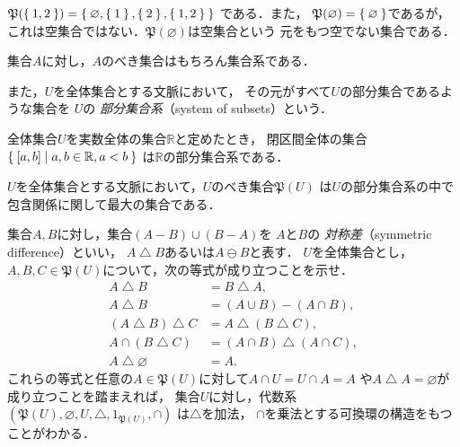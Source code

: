     \begin{ex} \label{ex:powerset}
      $\mathfrak{P}(\Set{1,  2} ) = 
      \Set{ \varnothing ,  \Set{1} ,  \Set{2} ,  \Set{1,  2}}$
      である．また，
      $\mathfrak{P}( \varnothing) = \Set{ \varnothing}$であるが，
      これは空集合ではない．$\mathfrak{P}( \varnothing)$は空集合という
      元をもつ空でない集合である．
    \end{ex}
    
    
    集合$A$に対し，$A$のべき集合はもちろん集合系である．

    また，$U$を全体集合とする文脈において，
    その元がすべて$U$の部分集合であるような集合を
    $U$の
    \emph{部分集合系}（system of subsets）という．

    \begin{ex} \label{ex:systemR}
      全体集合$U$を実数全体の集合$\mathbb{R}$と定めたとき，
      閉区間全体の集合$\Set{ [a,b] \mid a,b \in \mathbb{R} , a<b}$
      は$\mathbb{R}$の部分集合系である．
    \end{ex}

    $U$を全体集合とする文脈において，$U$のべき集合$\mathfrak{P}(U)$
    は$U$の部分集合系の中で包含関係に関して最大の集合である．

 
    \begin{que} \label{que:taisyousa}
      集合$A,  B$に対し，集合$(A-B) \cup (B - A) $を
      $A$と$B$の
      \emph{対称差}（symmetric difference）といい，
      $A \bigtriangleup B$あるいは$A \ominus B$と表す．
      $U$を全体集合とし，
      $A,  B,  C \in \mathfrak{P}(U)$について，次の等式が成り立つことを示せ．
      \begin{align}
        A \bigtriangleup B & = B \bigtriangleup A ,
        \label{eq:symdiftaisyou} \\
        A \bigtriangleup B & = (A \cup B) - (A \cap B),
        \label{eq:symdifcupcap} \\
        (A \bigtriangleup B) \bigtriangleup C & = A \bigtriangleup (B \bigtriangleup C),
        \label{eq:symdifketugou} \\
        A \cap ( B \bigtriangleup C) & = (A \cap B) \bigtriangleup (A \cap C),
        \label{eq:symdifcapbunpai} \\
        A \bigtriangleup \varnothing & = A .
        \label{eq:symdiftanigen} 
      \end{align}
      これらの等式と任意の$A \in \mathfrak{P}(U)$に対して$A \cap U = U \cap A =A$
      や$A \bigtriangleup A = \varnothing$が成り立つことを踏まえれば，
      集合$U$に対し，代数系$(\mathfrak{P}(U) , \varnothing , 
      U, \bigtriangleup, 1_{\mathfrak{P}(U)} ,\cap)$
      は$\bigtriangleup$を加法，
      $\cap$を乗法とする可換環の構造をもつことがわかる．
    \end{que}

